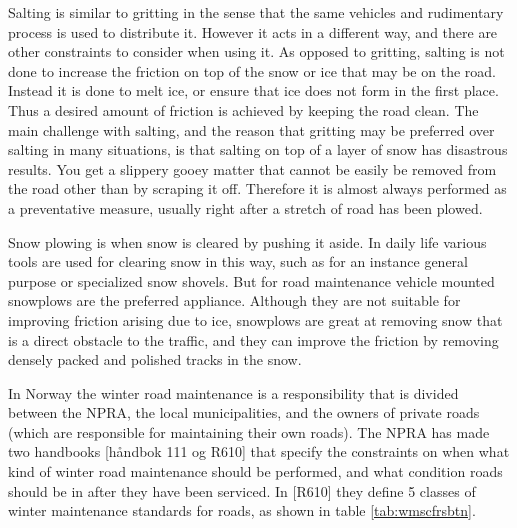 Salting is similar to gritting in the sense that the same vehicles and rudimentary process is used to distribute it. However it acts in a different way, and there are other constraints to consider when using it. As opposed to gritting, salting is not done to increase the friction on top of the snow or ice that may be on the road. Instead it is done to melt ice, or ensure that ice does not form in the first place. Thus a desired amount of friction is achieved by keeping the road clean. The main challenge with salting, and the reason that gritting may be preferred over salting in many situations, is that salting on top of a layer of snow has disastrous results. You get a slippery gooey matter that cannot be easily be removed from the road other than by scraping it off. Therefore it is almost always performed as a preventative measure, usually right after a stretch of road has been plowed.

Snow plowing is when snow is cleared by pushing it aside. In daily life various tools are used for clearing snow in this way, such as for an instance general purpose or specialized snow shovels. But for road maintenance vehicle mounted snowplows are the preferred appliance. Although they are not suitable for improving friction arising due to ice, snowplows are great at removing snow that is a direct obstacle to the traffic, and they can improve the friction  by removing densely packed and polished tracks in the snow.

In Norway the winter road maintenance is a responsibility that is divided between the NPRA, the local municipalities, and the owners of private roads (which are responsible for maintaining their own roads). The NPRA has made two handbooks [håndbok 111 og R610] that specify the constraints on when what kind of winter road maintenance should be performed, and what condition roads should be in after they have been serviced. In [R610] they define 5 classes of winter maintenance standards for roads, as shown in table \ref{tab:wmscfrsbtn}.

